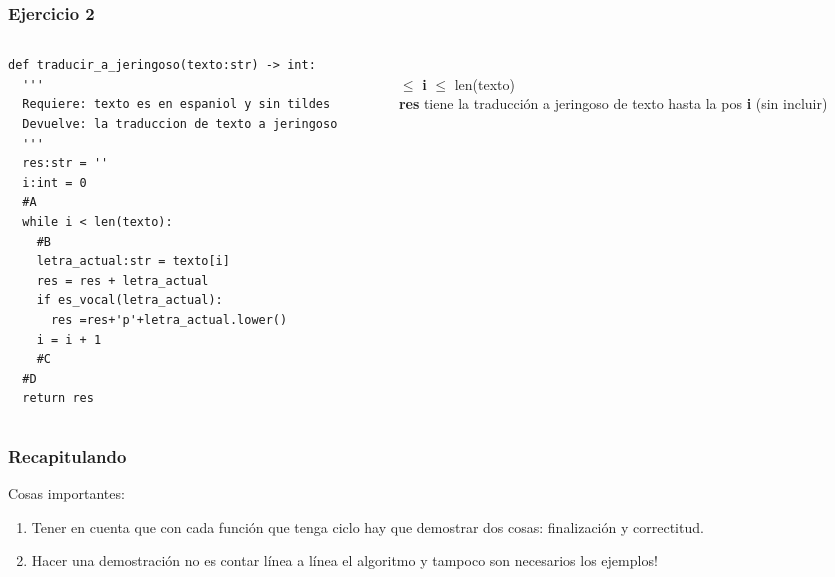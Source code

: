 \begin{frame}[fragile]\frametitle{Ejercicio 2}

\begin{columns} 
	
	\begin{column}{.68\textwidth}
		\begin{lstlisting}[style=python]
def traducir_a_jeringoso(texto:str) -> int:
  '''
  Requiere: texto es en espaniol y sin tildes
  Devuelve: la traduccion de texto a jeringoso
  '''
  res:str = ''
  i:int = 0
  #A
  while i < len(texto):
    #B
    letra_actual:str = texto[i]
    res = res + letra_actual
    if es_vocal(letra_actual):
      res =res+'p'+letra_actual.lower()
    i = i + 1
    #C
  #D
  return res
		\end{lstlisting}
	\end{column}
	\pause 
	\begin{column}{.28\textwidth}
		
		\begin{center}
			\medskip
			\\
			 $\leq$ \textbf{i} $\leq$ len(texto) \\
			\medskip
			\textbf{res} tiene la traducci\'on a jeringoso de texto hasta la pos \textbf{i} (sin incluir)
		\end{center}		
	\end{column}%
\end{columns}

\end{frame}


\begin{frame}\frametitle{Recapitulando}

Cosas importantes:\bigskip

\begin{enumerate}

\item Tener en cuenta que con cada funci\'on que tenga ciclo hay que demostrar dos cosas: finalizaci\'on y correctitud.


\item Hacer una demostraci\'on no es contar l\'inea a l\'inea el algoritmo y tampoco son necesarios los ejemplos!


\end{enumerate}

\end{frame}



